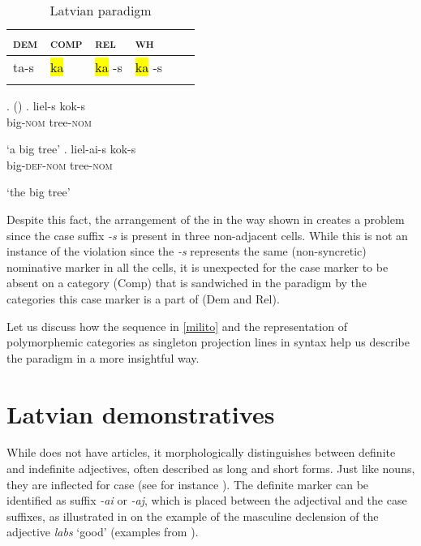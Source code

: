 \begin{table}
\caption{Latvian paradigm\label{Lat:problem}}
\begin{tabular}[h]{ l l l l l l }
\lsptoprule
\textsc{dem} 	& \textsc{comp} 	& \textsc{rel}  	& \textsc{wh}\\	
\midrule
ta-s & \hl{ ka } & \hl{ ka }-s & \hl{ ka }-s\\
\lspbottomrule
\end{tabular}
\end{table}


\ex.  (\citealt[84]{Lyons1999})\label{conc1}
\ag. liel-s kok-s\\
big-\textsc{nom} tree-\textsc{nom}\\
\strut `a big tree'
\bg. liel-ai-s kok-s\\
big-\textsc{def-nom} tree-\textsc{nom}\\
\strut `the big tree'\label{Lat:koks}

Despite this fact, the arrangement of the   in the way shown  in   creates a problem since the case suffix \textit{-s} is present in three non-adjacent cells. While this is not an instance of the  violation since the \textit{-s}  represents the same (non-syncretic) nominative marker in all the cells, it is unexpected for the case marker to be absent on a category (Comp) that is sandwiched in the paradigm by the categories this case marker is a part of (Dem and Rel). 
\par
Let us discuss how the sequence in \ref{milito} and the representation of polymorphemic categories as  singleton projection lines in syntax help us describe the  paradigm in a more insightful way.

\section{Latvian demonstratives}\largerpage

While  does not have articles, it morphologically distinguishes between definite and indefinite adjectives, often described as long and short forms. Just like  nouns, they are inflected for case (see for instance \citealt[57--58]{Mathiassen1997}). The definite marker can be identified as suffix \textit{-ai} or \textit{-aj}, which is placed between the adjectival  and the case suffixes, as illustrated in  on the example of the masculine declension of the adjective \textit{labs} `good' (examples from \citealt[293--294]{Eckert-etal-1994}). 

